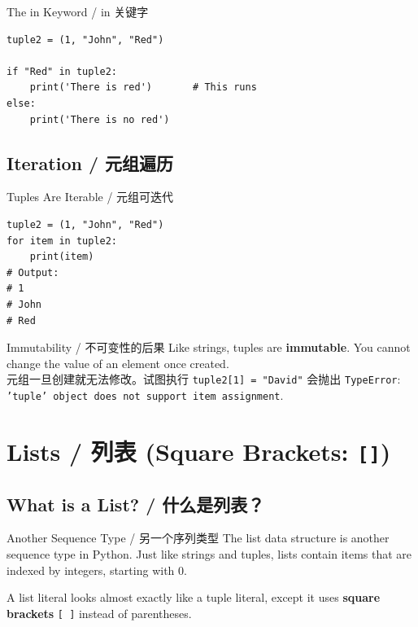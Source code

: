 \documentclass[11pt,a4paper]{report}
\let\oldtexttt\texttt
\renewcommand{\texttt}[1]{\textcolor{mainblue}{\oldtexttt{#1}}}
\begin{document}
\begin{examplebox}{The in Keyword / in 关键字}
\begin{lstlisting}
tuple2 = (1, "John", "Red")

if "Red" in tuple2:
    print('There is red')       # This runs
else:
    print('There is no red')
\end{lstlisting}
\end{examplebox}

\subsection{Iteration / 元组遍历}

\begin{examplebox}{Tuples Are Iterable / 元组可迭代}
\begin{lstlisting}
tuple2 = (1, "John", "Red")
for item in tuple2:
    print(item)
# Output:
# 1
# John
# Red
\end{lstlisting}
\end{examplebox}

\begin{warning}{Immutability / 不可变性的后果}
    Like strings, tuples are \textbf{immutable}. You cannot change the value of an element once created. \\
    元组一旦创建就无法修改。试图执行 \texttt{tuple2[1] = "David"} 会抛出 \texttt{TypeError}: \texttt{'tuple' object does not support item assignment}.
\end{warning}

\section{Lists / 列表 (Square Brackets: \texttt{[]})}

\subsection{What is a List? / 什么是列表？}

\begin{concept}{Another Sequence Type / 另一个序列类型}
    The list data structure is another sequence type in Python. Just like strings and tuples, lists contain items that are indexed by integers, starting with 0.

    A list literal looks almost exactly like a tuple literal, except it uses \textbf{square brackets} \texttt{[ ]} instead of parentheses.
\end{concept}
\end{document}
